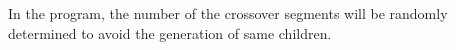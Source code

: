 \documentclass[11pt, a4paper]{article}
\begin{document}
In the program, the number of the crossover segments will be randomly determined to avoid the generation of same children.








  
% 





\end{document}
